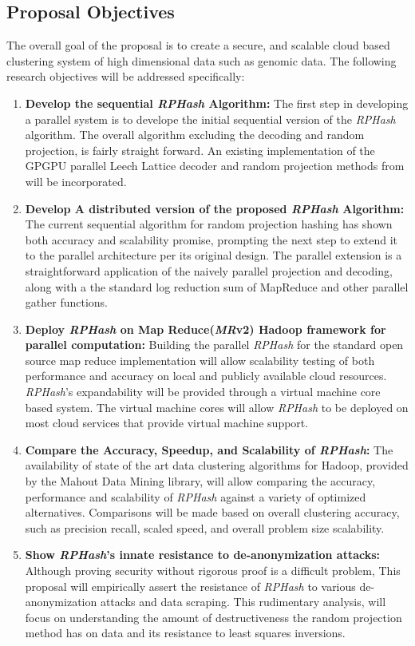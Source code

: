 \documentclass[a4paper,10pt]{article}
\begin{document}
\subsection{Proposal Objectives} The overall goal of the proposal is
to create a secure, and scalable cloud based clustering system of high
dimensional data such as genomic data.	The following research objectives
will be addressed specifically:
\begin{enumerate}
\item \textbf{Develop the sequential \emph{RPHash} Algorithm:}
The first step in developing a parallel system is to develope the initial
sequential version of the \emph{RPHash} algorithm.  The overall algorithm 
excluding the decoding and random projection, is fairly straight forward.  An 
existing implementation of the GPGPU parallel Leech Lattice decoder and 
random projection methods from \cite{carraher} will be incorporated.

\item \textbf{Develop A distributed version of the proposed \emph{RPHash} 
Algorithm:}
The current sequential algorithm for random projection hashing has shown both 
accuracy and scalability promise, prompting the next step to extend it to the 
parallel architecture per its original design.  The parallel extension is a 
straightforward application of the naively parallel projection and decoding, 
along with a the standard log reduction sum of MapReduce\cite{mapreduce} and 
other parallel gather functions\cite{mpispec}.

\item \textbf{ Deploy \emph{RPHash} on Map Reduce(\emph{MR}v2) Hadoop 
framework for parallel computation:} Building the parallel \emph{RPHash} for 
the standard open source map reduce implementation will allow scalability 
testing of both performance and accuracy on local and publicly available cloud 
resources.  \emph{RPHash}'s expandability will be provided through a virtual 
machine core based system.  The virtual machine cores will allow \emph{RPHash} 
to be deployed on most cloud services that provide virtual machine support.


\item \textbf{Compare the Accuracy, Speedup, and Scalability of 
\emph{RPHash}:} 
The availability of state of the art data clustering algorithms for Hadoop, 
provided by the Mahout Data Mining library, will allow comparing the accuracy, 
performance and scalability of \emph{RPHash} against a variety of optimized 
alternatives.  Comparisons will be made based on overall clustering accuracy, 
such as precision recall, scaled speed, and overall problem size scalability.

\item \textbf{Show \emph{RPHash}'s innate resistance to de-anonymization 
attacks:} 
Although proving security without rigorous proof is a difficult problem, This 
proposal will empirically assert the resistance of \emph{RPHash} to various 
de-anonymization attacks and data scraping.  This rudimentary analysis, will 
focus on understanding the amount of destructiveness the random projection 
method has on data and its resistance to least squares inversions.
\end{enumerate}
\end{document}
